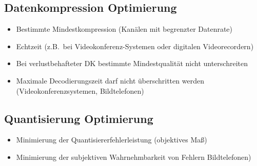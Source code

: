 

\subsection*{Datenkompression Optimierung}
\begin{itemize}
	\setlength{\parskip}{0pt}
	\setlength{\itemsep}{0pt plus 1pt}
	\item Bestimmte Mindestkompression (Kanälen mit begrenzter Datenrate)
	\item Echtzeit (z.B.\ bei Videokonferenz-Systemen oder digitalen Videorecordern)
	\item Bei verlustbehafteter DK bestimmte Mindestqualität nicht unterschreiten
	\item Maximale Decodierungszeit darf nicht überschritten werden (Videokonferenzsystemen, Bildtelefonen)
\end{itemize}

\subsection*{Quantisierung Optimierung}
\begin{itemize}
	\setlength{\parskip}{0pt}
	\setlength{\itemsep}{0pt plus 1pt}
	\item Minimierung der Quantisiererfehlerleistung (objektives Maß)
	\item Minimierung der subjektiven Wahrnehmbarkeit von Fehlern Bildtelefonen)
\end{itemize}






